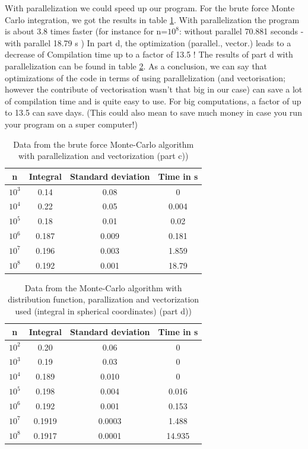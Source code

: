 \documentclass[10pt,a4paper]{article}
\begin{document}
With parallelization we could speed up our program. For the brute force Monte Carlo integration, we got the results in table \ref{Data from the brute force montecarlo algorithm (part c)) with vec and para}. With parallelization the program is about 3.8 times faster (for instance for n=$10^8$: without parallel 70.881 seconds - with parallel 18.79 s )
In part d, the optimization (parallel., vector.) leads to a decrease of Compilation time up to a factor of 13.5 ! The results of part d with parallelization can be found in table \ref{Data from the  montecarlo algorithm with vectorization and parallelization (part d))}. As a conclusion, we can say that optimizations of the code in terms of using parallelization (and vectorisation; however the contribute of vectorisation wasn't that big in our case) can save a lot of compilation time and is quite easy to use. For big computations, a factor of up to 13.5 can save days. (This could also mean to save much money in case you run your program on a super computer!)

\begin{table}[h]
\centering
\caption{Data from the brute force Monte-Carlo algorithm with parallelization and vectorization (part c))}
\label{Data from the brute force montecarlo algorithm (part c)) with vec and para}
\begin{tabular}{c|c|c|c}
n & Integral & Standard deviation & Time in s \\
\hline\hline
$10^3$ & 0.14 & 0.08 & 0 \\
$10^4$ & 0.22 & 0.05 & 0.004 \\
$10^5$ & 0.18 & 0.01 & 0.02 \\
$10^6$ & 0.187 & 0.009 & 0.181 \\
$10^7$ & 0.196 & 0.003 & 1.859 \\
$10^8$ & 0.192 & 0.001 & 18.79
\end{tabular}
\end{table}

\begin{table}[h]
\centering
\caption{Data from the Monte-Carlo algorithm with distribution function, parallization and vectorization used (integral in spherical coordinates) (part d))}
\label{Data from the  montecarlo algorithm with vectorization and parallelization (part d))}
\begin{tabular}{c|c|c|c}
n & Integral & Standard deviation & Time in s \\
\hline\hline
$10^2$ & 0.20 & 0.06 & 0\\
$10^3$ & 0.19 & 0.03 & 0\\
$10^4$ & 0.189 & 0.010 & 0 \\
$10^5$ & 0.198 & 0.004 & 0.016 \\
$10^6$ & 0.192 & 0.001 & 0.153 \\
$10^7$ & 0.1919 & 0.0003 & 1.488 \\
$10^8$ & 0.1917 & 0.0001 & 14.935 
\end{tabular}
\end{table}
\end{document}
